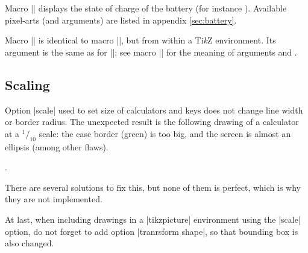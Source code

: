 \documentclass{ltxdoc}
\newcommand{\TikZ}{Ti\emph{k}Z}
\begin{document}
 \DescribeMacro{\battery}
 Macro |\battery| displays the state of charge of the battery (for instance  ). Available pixel-arts (and arguments) are listed in appendix \ref{sec:battery}.

 \DescribeMacro{\tikzbattery}
 Macro |\tikzbattery| is identical to macro |\battery|, but from within a \TikZ{} environment. Its  argument is the same as for |\battery|; see macro |\tikzmenu| for the meaning of arguments  and .

 \subsection{Scaling}
 \label{sec:scale}

 Option |scale| used to set size of calculators and keys does not change line width or border radius. The unexpected result is the following drawing of a calculator at a $^1/_{10}$ scale: the case border (green) is too big, and the screen is almost an ellipsis (among other flaws).

 \begin{center}
 .
 \end{center}

 There are several solutions to fix this, but none of them is perfect, which is why they are not implemented.


 At last, when including drawings in a |tikzpicture| environment using the |scale| option, do not forget to add option |tranrsform shape|, so that bounding box is also changed.
\end{document}
